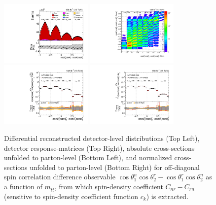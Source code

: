 \clearpage
\begin{figure}[htb]
\begin{center}
 \includegraphics[width=0.40\textwidth]{fig_fullRun2UL/controlplots/combined/Hyp_LLBarCMnr_vs_TTBarMass.pdf}
 \includegraphics[width=0.40\textwidth]{fig_fullRun2UL/unfolding/combined/ResponseMatrix_c_Mnr_mttbar.pdf} \\
 \includegraphics[width=0.40\textwidth]{fig_fullRun2UL/unfolding/combined/UnfoldedResults_c_Mnr_mttbar.pdf}
 \includegraphics[width=0.40\textwidth]{fig_fullRun2UL/unfolding/combined/UnfoldedResultsNorm_c_Mnr_mttbar.pdf} \\
\label{fig:c_Mnr_mttbar}
\caption{Differential reconstructed detector-level distributions (Top Left), detector response-matrices (Top Right), absolute cross-sections unfolded to parton-level (Bottom Left), and normalized cross-sections unfolded to parton-level (Bottom Right) for off-diagonal spin correlation difference observable $\cos\theta_{1}^{n}\cos\theta_{2}^{r}-\cos\theta_{1}^{r}\cos\theta_{2}^{n}$ as a function of $m_{t\bar{t}}$, from which spin-density coefficient $C_{nr}-C_{rn}$ (sensitive to spin-density coefficient function $c_k$) is extracted.}
\end{center}
\end{figure}
